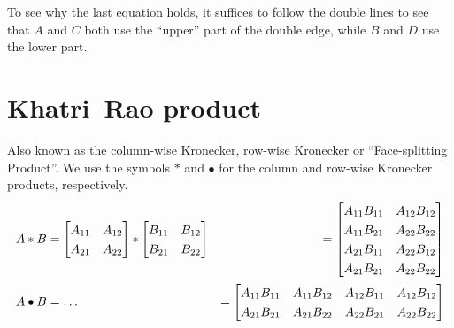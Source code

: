 \documentclass[oneside]{book}
\begin{document}
To see why the last equation holds, it suffices to follow the double lines to see that $A$ and $C$ both use the ``upper'' part of the double edge, while $B$ and $D$ use the lower part.

\section{Khatri–Rao product}
Also known as the column-wise Kronecker, row-wise Kronecker or ``Face-splitting Product''.
We use the symbols $\ast$ and $\bullet$ for the column and row-wise Kronecker products, respectively.
\begin{align*}
   A \ast B &=
   \renewcommand*{\arraystretch}{1.3}
   \begin{bmatrix}
      A_{11} & A_{12} \\
      A_{21} & A_{22}
   \end{bmatrix}
   \ast
   \renewcommand*{\arraystretch}{1.3}
   \begin{bmatrix}
      B_{11} & B_{12} \\
      B_{21} & B_{22}
   \end{bmatrix}
            &=
   \renewcommand*{\arraystretch}{1.3}
   \begin{bmatrix}
      A_{11} B_{11} & A_{12} B_{12} \\
      A_{11} B_{21} & A_{22} B_{22} \\
      A_{21} B_{11} & A_{22} B_{12} \\
      A_{21} B_{21} & A_{22} B_{22}
   \end{bmatrix}
   \\
   A \bullet B &= \dots
            &=
   \renewcommand*{\arraystretch}{1.3}
   \begin{bmatrix}
      A_{11}  B_{11} & A_{11} B_{12} & A_{12} B_{11} & A_{12} B_{12} \\
      A_{21}  B_{21} & A_{21} B_{22} & A_{22} B_{21} & A_{22} B_{22}
   \end{bmatrix}
\end{align*}
\end{document}

